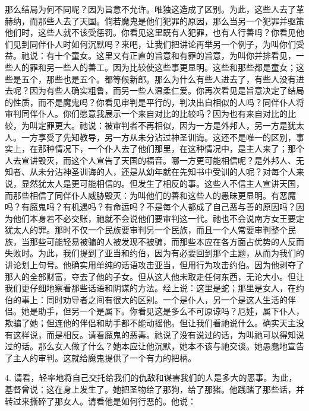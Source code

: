 那么结局为何不同呢？因为旨意不允许。唯独这造成了区别。为此，这些人去了革赫纳，而那些人去了天国。倘若魔鬼是他们犯罪的原因，那么当另一个犯罪并驱策他们时，这些人就不该受惩罚。你看见这里既有人犯罪，也有人行善吗？你看见他们见到同伴仆人时如何沉默吗？来吧，让我们把讲论再举另一个例子，为叫你们受益。祂说：有十个童女。这里又有正直的旨意和有罪的旨意，为叫你并排看见，一些人的罪和另一些人的善工。因为比较使这些事更显明。这些和那些都是童女；这些是五个，那些也是五个。都等候新郎。那么为什么有些人进去了，有些人没有进去呢？因为有些人确实粗鲁，而另一些人温柔仁爱。你再次看见是旨意决定了结局的性质，而不是魔鬼吗？你看见审判是平行的，判决出自相似的人吗？同伴仆人将审判同伴仆人。你们愿意我展示一个来自对比的比较吗？因为也有来自对比的比较，为叫定罪更大。祂说：被审判者不再相似，因为一方是外邦人，另一方是犹太人。一方享受了先知教导，另一方从未分沾过神圣训诲。这还不是唯一的区别，事实上，在那种情况下，一个仆人去了他们那里，在这种情况中，是主人来了；那个人去宣讲毁灭，而这个人宣告了天国的福音。哪一方更可能相信呢？是外邦人、无知者、从未分沾神圣训诲的人，还是从幼年就在先知书中受训的人呢？对每个人来说，显然犹太人是更可能相信的。但发生了相反的事。这些人不信主人宣讲天国，而那些相信了同伴仆人威胁毁灭：为叫他们的善和这些人的愚昧更显明。有恶魔吗？有魔鬼吗？有机遇吗？有命运吗？不是每个人都成了自己恶与善的原因吗？因为他们本身若不必交账，祂就不会说他们要审判这一代。祂也不会说南方女王要定犹太人的罪。那时不仅一个民族要审判另一个民族，而且一个人常要审判整个民族，当那些可能轻易被骗的人被发现不被骗，而那些本应在各方面占优势的人反而失败时。为此，我们提到了亚当和约伯，因为有必要回到那个主题，从而为我们的讲论划上句号。他确实用单纯的话语攻击亚当，但用行为攻击约伯。因为他剥夺了那人的全部财富，夺去了他的子女。但从这人他未取走任何东西，无论大小。但让我们更仔细地察看那些话语和阴谋的方法。经上说：这里是蛇；那里是女人，在约伯的事上：同时劝导者之间有很大的区别。一个是仆人，另一个是这人生活的伴侣。她是助手，但另一个是属下。你看见这是多么不可原谅吗？厄娃，属下仆人，欺骗了她；但连他的伴侣和助手都不能动摇他。但让我们看祂说什么。确实天主没有这样说，而是相反。请看魔鬼的恶毒。祂说了没有说过的话，为叫祂可以得知说过的话。那么女人做了什么？她本应让他沉默，她本不该与祂交谈。她愚蠢地宣告了主人的审判。这就给魔鬼提供了一个有力的把柄。\par

4. 请看，轻率地将自己交托给我们的仇敌和谋害我们的人是多大的恶事。为此，基督曾说：这在身上发生了。她把圣物给了那狗，给了那猪。他践踏了那些话，并转过来撕碎了那女人。请看他是如何行恶的。他说：\par

